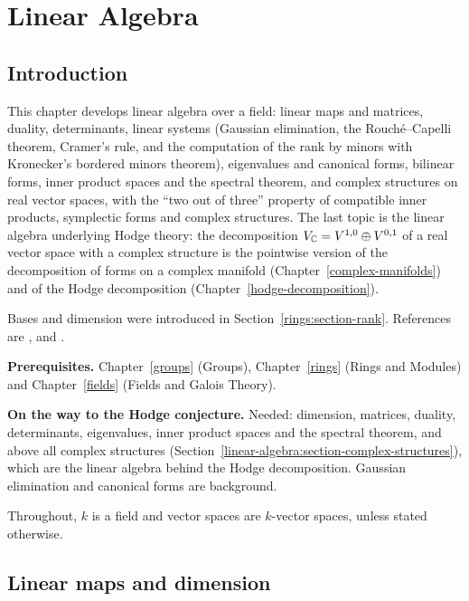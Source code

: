 \chapter{Linear Algebra}\label{linear-algebra}

\section{Introduction}\label{linear-algebra:section-introduction}

This chapter develops linear algebra over a field: linear maps and matrices, duality,
determinants, linear systems (Gaussian elimination, the Rouch\'e--Capelli theorem, Cramer's rule, and the computation
of the rank by minors with Kronecker's bordered minors theorem), eigenvalues and canonical forms, bilinear forms, inner product spaces
and the spectral theorem, and complex structures on real vector spaces, with the ``two out of three''
property of compatible inner products, symplectic forms and complex structures. The last topic
is the linear algebra underlying Hodge theory: the decomposition
$V_{\mathbb{C}} = V^{1,0} \oplus V^{0,1}$ of a real vector space with a complex structure is the
pointwise version of the decomposition of forms on a complex manifold
(Chapter~\ref{complex-manifolds}) and of the Hodge decomposition
(Chapter~\ref{hodge-decomposition}).

Bases and dimension were introduced in Section~\ref{rings:section-rank}. References are
\cite{halmos-fdvs}, \cite{axler-linear} and \cite[Chapters XIII--XV]{lang-algebra}.

\noindent\textbf{Prerequisites.} Chapter~\ref{groups} (Groups),
Chapter~\ref{rings} (Rings and Modules) and Chapter~\ref{fields} (Fields and Galois
Theory).

\noindent\textbf{On the way to the Hodge conjecture.} Needed: dimension, matrices, duality, determinants, eigenvalues, inner product spaces and the spectral theorem, and above all complex structures
(Section~\ref{linear-algebra:section-complex-structures}), which are the linear algebra behind the Hodge decomposition. Gaussian elimination and canonical forms are background.

Throughout, $k$ is a field and vector spaces are $k$-vector spaces, unless stated
otherwise.

\section{Linear maps and dimension}\label{linear-algebra:section-dimension}

